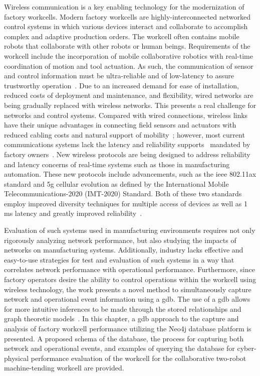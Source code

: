 Wireless communication is a key enabling technology for the modernization of factory workcells. Modern factory workcells are highly-interconnected networked control systems in which various devices interact and collaborate to accomplish complex and adaptive production orders. The workcell often contains mobile robots that collaborate with other robots or human beings. Requirements of the workcell include the incorporation of mobile collaborative robotics with real-time coordination of motion and tool actuation.  As such, the communication of sensor and control information must be ultra-reliable and of low-latency to assure trustworthy operation~\cite{wirelessAutomation2017}. Due to an increased demand for ease of installation, reduced costs of deployment and maintenance, and flexibility, wired networks are being gradually replaced with wireless networks. This presents a real challenge for networks and control systems. Compared with wired connections, wireless links have their unique advantages in connecting field sensors and actuators with reduced cabling costs and natural support of mobility~\cite{ieMag2018}; however, most current communications systems lack the latency and reliability supports~\cite{etsi103588} mandated by factory owners~\cite{Industry40, SmartManuf}.  New wireless protocols are being designed to address reliability and latency concerns of real-time systems such as those in manufacturing automation.  These new protocols include advancements, such as the \gls{ieee} 802.11ax standard and \gls{5g} cellular evolution as defined by the International Mobile Telecommunications-2020 (IMT-2020) Standard.  Both of these two standards employ improved diversity techniques for multiple access of devices as well as 1 ms latency and greatly improved reliability~\cite{80211ax}. 

Evaluation of such systems used in manufacturing environments requires not only rigorously analyzing  network performance, but also studying the impacts of networks on manufacturing systems. Additionally, industry lacks effective and easy-to-use strategies for test and evaluation of such systems in a way that correlates network performance with operational performance. Furthermore, since factory operators desire the ability to control operations within the workcell using wireless technology, the work presents a novel method to simultaneously capture network and operational event information using a \gls{gdb}.  The use of a \gls{gdb} allows for more intuitive inferences to be made through the stored relationships and graph theoretic models~\cite{Angles:2008:SGD:1322432.1322433}. In this chapter, a \gls{gdb} approach to the capture and analysis of factory workcell performance utilizing the Neo4j database platform is presented. A proposed schema of the database, the process for capturing both network and operational events, and examples of querying the database for cyber-physical performance evaluation of the workcell for the collaborative two-robot machine-tending workcell\cite{Liu2019vancouver} are provided.

